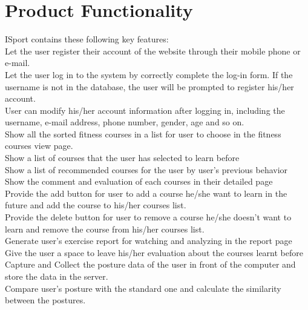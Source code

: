 \documentclass[16pt]{scrreprt}
\begin{document}
\section{Product Functionality}


ISport contains these following key features:\\

Let the user register their account of the website through their mobile phone or e-mail.\\

Let the user log in to the system by correctly complete the log-in form. If the username is not in the database, the user will be prompted to register his/her account.\\

User can modify his/her account information after logging in, including the username, e-mail address, phone number, gender, age and so on.\\

Show all the sorted fitness courses in a list for user to choose in the fitness courses view page. \\

Show a list of courses that the user has selected to learn before\\

Show a list of recommended courses for the user by user's previous behavior \\

Show the comment and evaluation of each courses in their detailed page\\

Provide the add button for user to add a course he/she want to learn in the future and add the course to his/her courses list.\\

Provide the delete button for user to remove a course he/she doesn't want to learn and remove the course from his/her courses list.\\


Generate user's exercise report for watching and analyzing in the report page\\

Give the user a space to leave his/her evaluation about the courses learnt before\\

Capture and Collect the posture data of the user in front of the computer and store the data in the server.\\


Compare user's posture with the standard one and calculate the similarity between the postures.\\
\end{document}
